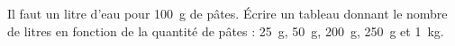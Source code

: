 
\begin{exercice}\label{exo2smath-0115}

    Il faut un litre d'eau pour \SI{100}{\gram} de pâtes. Écrire un tableau donnant le nombre de litres en fonction de la quantité de pâtes : \SI{25}{\gram}, \SI{50}{\gram}, \SI{200}{\gram}, \SI{250}{\gram} et \SI{1}{\kilo\gram}.

\end{exercice}
